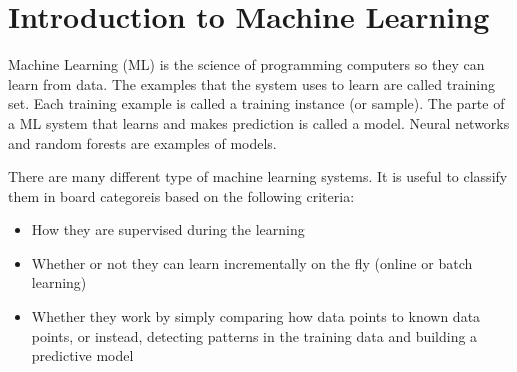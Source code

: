\chapter{Introduction to Machine Learning}
Machine Learning (ML) is the science of programming computers so they can learn from data. The examples that the system uses to learn are called
training set. Each training example is called a training instance (or sample). The parte of a ML system that learns and makes prediction is called a model.
Neural networks and random forests are examples of models.

There are many different type of machine learning systems. It is useful to classify them in board categoreis based on the following criteria:
\begin{itemize}
    \item How they are supervised during the learning
    \item Whether or not they can learn incrementally on the fly (online or batch learning)
    \item Whether they work by simply comparing how data points to known data points, or instead, detecting patterns in the training data and building a predictive model
\end{itemize}




